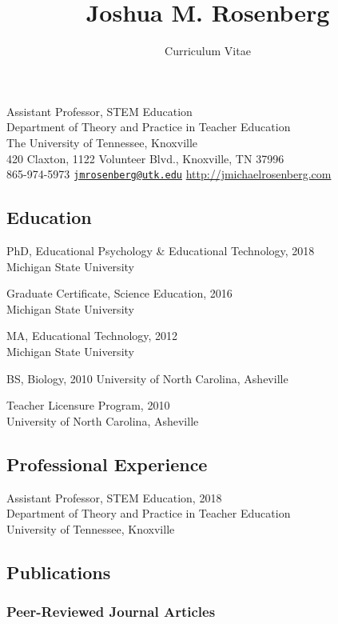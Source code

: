 \documentclass[]{article}
\title{Joshua M. Rosenberg}
\author{Curriculum Vitae}
\date{}
\begin{document}
\maketitle

\begingroup
\center
Assistant Professor, STEM Education\\
Department of Theory and Practice in Teacher Education\\
The University of Tennessee, Knoxville\\
420 Claxton, 1122 Volunteer Blvd., Knoxville, TN 37996\\
865-974-5973 \textbar{}
\href{mailto:jmrosenberg@utk.edu}{\nolinkurl{jmrosenberg@utk.edu}}
\textbar{} \url{http://jmichaelrosenberg.com}\\
\endgroup

\subsection{Education}\label{education}

PhD, Educational Psychology \& Educational Technology, 2018\\
Michigan State University

Graduate Certificate, Science Education, 2016\\
Michigan State University

MA, Educational Technology, 2012\\
Michigan State University

BS, Biology, 2010 University of North Carolina, Asheville

Teacher Licensure Program, 2010\\
University of North Carolina, Asheville

\subsection{Professional Experience}\label{professional-experience}

Assistant Professor, STEM Education, 2018\\
Department of Theory and Practice in Teacher Education\\
University of Tennessee, Knoxville

\subsection{Publications}\label{publications}

\subsubsection{Peer-Reviewed Journal
Articles}\label{peer-reviewed-journal-articles}
\end{document}
